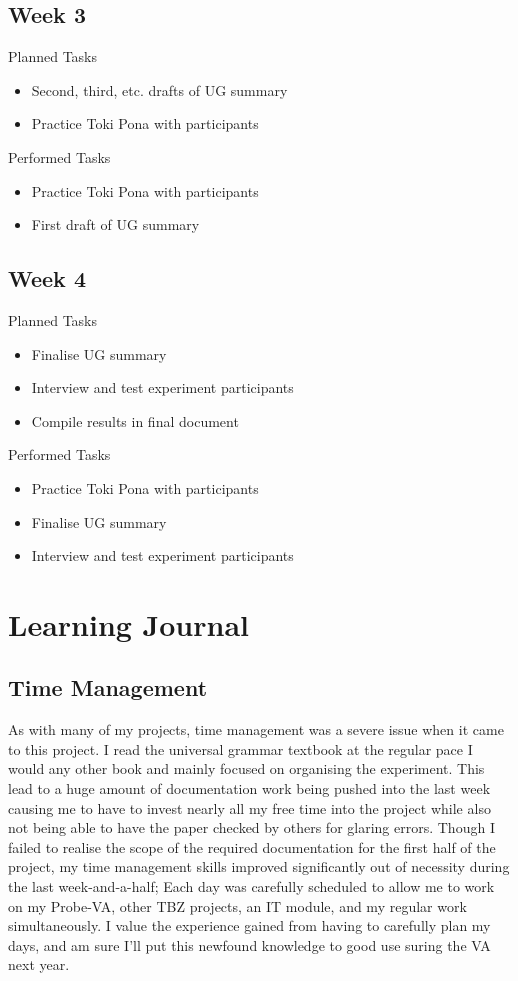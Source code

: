 \documentclass[a4paper,10pt]{article}
\begin{document}
\subsection{Week 3}
\large{Planned Tasks}
\begin{itemize}
	\item Second, third, etc. drafts of UG summary
	\item Practice Toki Pona with participants
\end{itemize}
\large{Performed Tasks}
\begin{itemize}
	\item Practice Toki Pona with participants
	\item First draft of UG summary
\end{itemize}
\subsection{Week 4}
\large{Planned Tasks}
\begin{itemize}
	\item Finalise UG summary
	\item Interview and test experiment participants
	\item Compile results in final document
\end{itemize}
\large{Performed Tasks}
\begin{itemize}
	\item Practice Toki Pona with participants
	\item Finalise UG summary
	\item Interview and test experiment participants
\end{itemize}


\section{Learning Journal} %
\subsection{Time Management}
As with many of my projects, time management was a severe issue when it came to this project. I read
the universal grammar textbook at the regular pace I would any other book and mainly focused on
organising the experiment. This lead to a huge amount of documentation work being pushed into the
last week causing me to have to invest nearly all my free time into the project while also not being
able to have the paper checked by others for glaring errors. Though I failed to realise the scope
of the required documentation for the first half of the project, my time management skills improved
significantly out of necessity during the last week-and-a-half; Each day was carefully scheduled to
allow me to work on my Probe-VA, other TBZ projects, an IT module, and my regular work simultaneously.
I value the experience gained from having to carefully plan my days, and am sure I'll put this newfound
knowledge to good use suring the VA next year.
\end{document}

